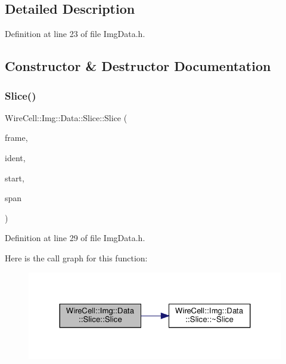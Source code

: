 \subsection{Detailed Description}


Definition at line 23 of file Img\+Data.\+h.



\subsection{Constructor \& Destructor Documentation}
\mbox{\label{class_wire_cell_1_1_img_1_1_data_1_1_slice_afb42f4f44780fc228b76a96320e7cb0c}} 
\subsubsection{\texorpdfstring{Slice()}{Slice()}}
{\footnotesize\ttfamily Wire\+Cell\+::\+Img\+::\+Data\+::\+Slice\+::\+Slice (\begin{DoxyParamCaption}\item[{const \hyperlink{class_wire_cell_1_1_i_data_aff870b3ae8333cf9265941eef62498bc}{I\+Frame\+::pointer} \&}]{frame,  }\item[{int}]{ident,  }\item[{double}]{start,  }\item[{double}]{span }\end{DoxyParamCaption})\hspace{0.3cm}{\ttfamily [inline]}}



Definition at line 29 of file Img\+Data.\+h.

Here is the call graph for this function\+:
\nopagebreak
\begin{figure}[H]
\begin{center}
\leavevmode
\includegraphics[width=324pt]{class_wire_cell_1_1_img_1_1_data_1_1_slice_afb42f4f44780fc228b76a96320e7cb0c_cgraph}
\end{center}
\end{figure}
\mbox{\label{class_wire_cell_1_1_img_1_1_data_1_1_slice_af5eca11ee40a61159787ec35f2f1ed27}} 
